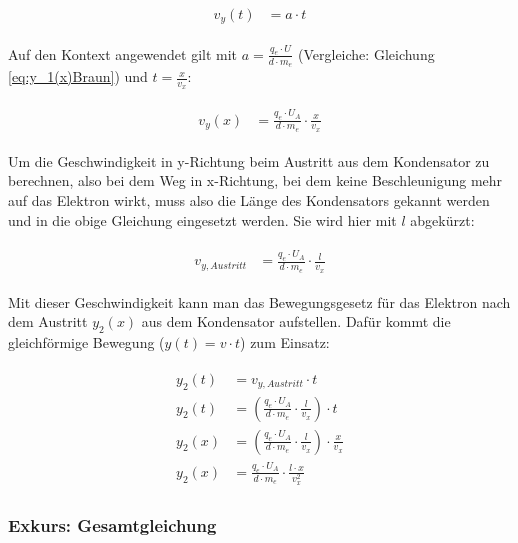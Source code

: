 \begin{align} \label{eq:v(t)Allgemein}
\begin{split}
	v_y(t) &= a \cdot t
\end{split}
\end{align}

\noindent Auf den Kontext angewendet gilt mit $a = \frac{q_e \cdot U}{d \cdot m_e}$ (Vergleiche: Gleichung \ref{eq:y_1(x)Braun}) und $t=\frac{x}{v_x}$:

\begin{align} \label{eq:v(x)Kontext}
\begin{split}
	v_y(x) &= \frac{q_e \cdot U_A}{d \cdot m_e} \cdot \frac{x}{v_x}
\end{split}
\end{align}

\noindent Um die Geschwindigkeit in y-Richtung beim Austritt aus dem Kondensator zu berechnen, also bei dem Weg in x-Richtung, bei dem keine Beschleunigung mehr auf das Elektron wirkt, muss also die Länge des Kondensators gekannt werden und in die obige Gleichung eingesetzt werden. Sie wird hier mit $l$ abgekürzt:

\begin{align} \label{eq:v(t)Gesamt}
\begin{split}
	v_{y,Austritt} &= \frac{q_e \cdot U_A}{d \cdot m_e} \cdot \frac{l}{v_x}
\end{split}
\end{align}

\noindent Mit dieser Geschwindigkeit kann man das Bewegungsgesetz für das Elektron nach dem Austritt $y_2(x)$ aus dem Kondensator aufstellen. Dafür kommt die gleichförmige Bewegung ($y(t) = v \cdot t$) zum Einsatz:

\begin{align} \label{eq:y(t)Gesamt}
\begin{split}
	y_2(t) &= v_{y,Austritt} \cdot t \\
	y_2(t) &= (\frac{q_e \cdot U_A}{d \cdot m_e} \cdot \frac{l}{v_x}) \cdot t \\
	y_2(x) &= (\frac{q_e \cdot U_A}{d \cdot m_e} \cdot \frac{l}{v_x}) \cdot \frac{x}{v_x} \\
	y_2(x) &= \frac{q_e \cdot U_A}{d \cdot m_e} \cdot \frac{l \cdot x}{v_{x}^2}
\end{split}
\end{align}

\subsubsection{Exkurs: Gesamtgleichung}

